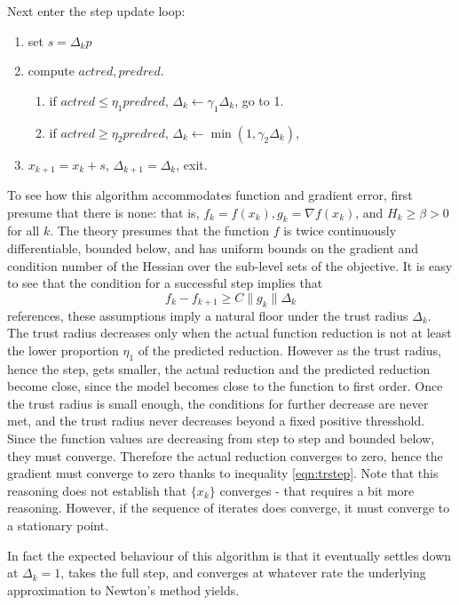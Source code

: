 Next enter the step update loop:
\begin{enumerate}
\item set $s=\Delta_k p$
\item compute $actred, predred$.
\begin{enumerate}

\item if $actred \le \eta_1 predred$, $\Delta_k \leftarrow \gamma_1 
  \Delta_k$, go to 1.
\item if $actred \ge \eta_2 predred$, $\Delta_k \leftarrow \min(1,\gamma_2 
  \Delta_k)$, 
\end{enumerate}
\item $x_{k+1}=x_k + s$, $\Delta_{k+1} = \Delta_k$, exit.
\end{enumerate}

To see how this algorithm accommodates function and gradient error,
first presume that there is none: that is, $f_k=f(x_k), g_k = \nabla
f(x_k)$, and $H_k \ge \beta > 0$ for all $k$.  The theory presumes that the
function $f$ is twice continuously differentiable, bounded below, and
has uniform bounds on the gradient and condition number of the Hessian
over the sub-level sets of the objective. It is easy to see that the
condition for a successful step implies that
\begin{equation}
\label{eqn:trstep}
f_k - f_{k+1} \ge C \|g_k\|\Delta_k
\end{equation}
references, these assumptions imply a natural floor
under the trust radius $\Delta_k$. The trust radius decreases only when the actual
function 
reduction is not at least the lower proportion $\eta_1$ of the
predicted reduction. However as the trust radius, hence the step, gets
smaller, the actual reduction and the predicted reduction become
close, since the model becomes close to the function to first
order. Once the trust radius is small enough, the conditions for
further decrease are never met, and the trust radius never decreases
beyond a fixed positive thresshold. Since the function values are
decreasing from step to step and bounded below, they must
converge. Therefore the actual reduction converges to zero, hence the
gradient must converge to zero thanks to inequality
\ref{eqn:trstep}. Note that this reasoning does not establish that
$\{x_k\}$ converges - that requires a bit more reasoning. However, if
the sequence of iterates does converge, it must converge to a
stationary point.

In fact the expected behaviour of this algorithm is that it eventually
settles down at $\Delta_k = 1$, takes the full step, and converges at
whatever rate the underlying approximation to Newton's method yields.

